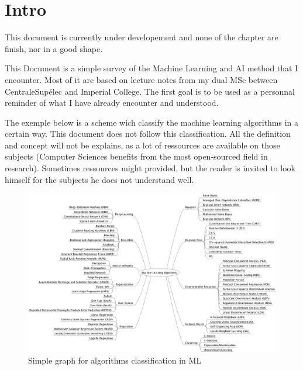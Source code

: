 
\chapter*{Intro} %
\label{cha:intro}

This document is currently under developement and none of the chapter are finish, nor in a good shape. 

This Document is a simple survey of the Machine Learning and AI method that I encounter. Most of it are based on lecture notes from my dual MSc between CentraleSupélec and Imperial College. The first goal is to be used as a personnal reminder of what I have already encounter and understood. 

The exemple below  is a scheme wich classify the machine learning algorithms in a certain way. This document does not follow this classification. 
All the definition and concept will not be explains, as a lot of ressources are available on those subjects (Computer Sciences benefits from the most open-sourced field in research). Sometimes ressources might provided, but the reader is invited to look himself for the subjects he does not understand well. 

\begin{figure}[ht]
\centering
\includegraphics[scale=0.35]{figures/MachineLearningAlgorithms}

\caption{Simple graph for algorithms classification in ML}
\end{figure}

